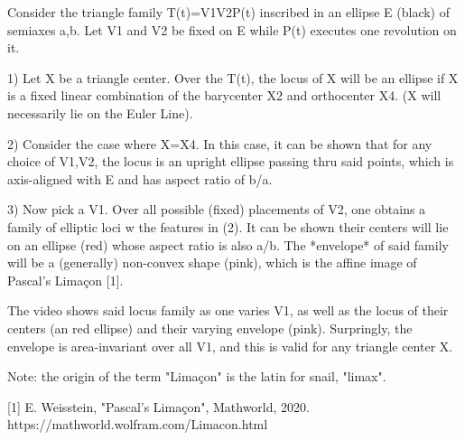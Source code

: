 Consider the triangle family T(t)=V1V2P(t) inscribed in an ellipse E (black) of semiaxes a,b. Let V1 and V2 be fixed on E while P(t) executes one revolution on it.

1) Let X be a triangle center. Over the T(t), the locus of X will be an ellipse if X is a fixed linear combination of the barycenter X2 and orthocenter X4. (X will necessarily lie on the Euler Line).

2) Consider the case where X=X4. In this case, it can be shown that for any choice of V1,V2, the locus is an upright ellipse passing thru said points, which is axis-aligned with E and has aspect ratio of b/a.

3) Now pick a V1. Over all possible (fixed) placements of V2, one obtains a family of elliptic loci w the features in (2). It can be shown their centers will lie on an ellipse (red) whose aspect ratio is also a/b.  The *envelope* of said family will be a (generally) non-convex shape (pink), which is the affine image of Pascal's Limaçon [1].

The video shows said locus family as one varies V1, as well as the locus of their centers (an red ellipse) and their varying envelope (pink). Surpringly, the envelope is area-invariant over all V1, and this is valid for any triangle center X.

Note: the origin of the term "Limaçon" is the latin for snail, "limax".

[1] E. Weisstein, "Pascal's Limaçon", Mathworld, 2020. https://mathworld.wolfram.com/Limacon.html